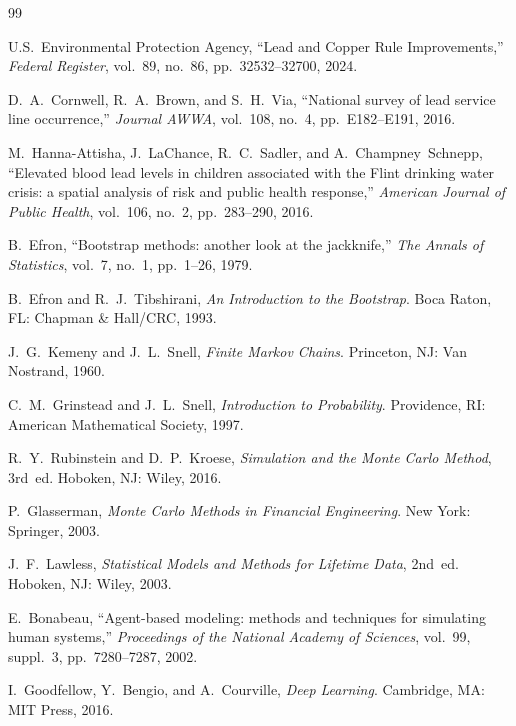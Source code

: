 \documentclass[11pt, letterpaper]{article}
\begin{document}
\begin{thebibliography}{99}

  U.S.\ Environmental Protection Agency, ``Lead and Copper Rule Improvements,''
  \textit{Federal Register}, vol.~89, no.~86, pp.~32532--32700, 2024.

  D.~A.~Cornwell, R.~A.~Brown, and S.~H.~Via, ``National survey of lead service line occurrence,''
  \textit{Journal AWWA}, vol.~108, no.~4, pp.~E182--E191, 2016.

  M.~Hanna-Attisha, J.~LaChance, R.~C.~Sadler, and A.~Champney~Schnepp, ``Elevated blood lead levels in children associated with the Flint drinking water crisis: a spatial analysis of risk and public health response,''
  \textit{American Journal of Public Health}, vol.~106, no.~2, pp.~283--290, 2016.

  B.~Efron, ``Bootstrap methods: another look at the jackknife,''
  \textit{The Annals of Statistics}, vol.~7, no.~1, pp.~1--26, 1979.

  B.~Efron and R.~J.~Tibshirani, \textit{An Introduction to the Bootstrap}.
  Boca Raton, FL: Chapman \& Hall/CRC, 1993.

  J.~G.~Kemeny and J.~L.~Snell, \textit{Finite Markov Chains}.
  Princeton, NJ: Van Nostrand, 1960.

  C.~M.~Grinstead and J.~L.~Snell, \textit{Introduction to Probability}.
  Providence, RI: American Mathematical Society, 1997.

  R.~Y.~Rubinstein and D.~P.~Kroese, \textit{Simulation and the Monte Carlo Method}, 3rd~ed.
  Hoboken, NJ: Wiley, 2016.

  P.~Glasserman, \textit{Monte Carlo Methods in Financial Engineering}.
  New York: Springer, 2003.

  J.~F.~Lawless, \textit{Statistical Models and Methods for Lifetime Data}, 2nd~ed.
  Hoboken, NJ: Wiley, 2003.

  E.~Bonabeau, ``Agent-based modeling: methods and techniques for simulating human systems,''
  \textit{Proceedings of the National Academy of Sciences}, vol.~99, suppl.~3, pp.~7280--7287, 2002.

  I.~Goodfellow, Y.~Bengio, and A.~Courville, \textit{Deep Learning}.
  Cambridge, MA: MIT Press, 2016.


\end{thebibliography}
\end{document}
